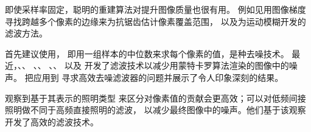 即使采样率固定，聪明的重建算法对提升图像质量也很有用。
例如见\citet{10.1145/1572769.1572787}用图像梯度
寻找跨越多个像素的边缘来为抗锯齿估计像素覆盖范围，
以及\citet{Guertin2014MotionBlur}为运动模糊开发的滤波方法。

\citet{55149}首先建议使用，
即用一组样本的中位数来求每个像素的值，是种去噪技术。
最近，\citet{10.1145/2010324.1964950}、\citet{10.1145/2185520.2185547}、
\citet{10.1111/cgf.12029}、\citet{10.1145/2366145.2366214}、
\citet{10.1111/cgf.12219}、\citet{10.1145/2532708}、
\citet{10.1111/cgf.12415}以及\citet{10.1111/cgf.12587}
开发了滤波技术以减少用蒙特卡罗算法渲染的图像中的噪声。
\citet{10.1145/2766977}把应用到
寻求高效去噪滤波器的问题并展示了令人印象深刻的结果。

\citet{jensen1995optimizing}观察到基于其表示的照明类型
来区分对像素值的贡献会更高效；可以对低频间接照明做不同于高频直接照明的滤波，
以减少最终图像中的噪声。他们基于该观察开发了高效的滤波技术。
